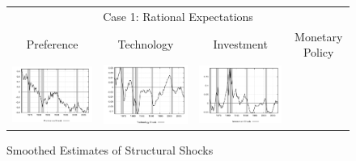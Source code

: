 \begin{figure}
\caption{Smoothed Estimates of Structural Shocks}\label{fg2:shocks}
\vspace*{1pc}\hspace*{-0.28in}
\begin{tabular}{cccc}
\multicolumn{4}{c}{Case 1: Rational Expectations} \\ 
Preference & Technology & Investment & Monetary Policy \\
\includegraphics[scale=0.22]{results_re/prefshock.png} & 
\includegraphics[scale=0.22]{results_re/techshock.png} & 
\includegraphics[scale=0.22]{results_re/invshock.png} & 

\end{tabular}
\end{figure}
